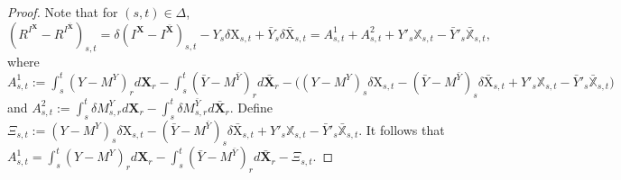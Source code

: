 \documentclass[11pt,reqno]{amsart}
\numberwithin{equation}{section}
\begin{document}
\begin{proof} 
Note that for $(s,t) \in \Delta$,
\begin{equation}\label{e:R-R = Xi + Y'X}
(R^{I^{\mathbf X}} - R^{I^{\bar{\mathbf X}}})_{s,t} = \delta(I^{\mathbf X} - I^{\bar{\mathbf X}})_{s,t} - Y_{s}\delta \mathrm X_{s,t} + \bar Y_{s}\delta \bar{\mathrm X}_{s,t} = A^1_{s,t} + A^{2}_{s,t} + Y'_{s} \mathbb X_{s,t} - \bar Y'_{s} \bar{\mathbb X}_{s,t}, 
\end{equation}
where
$
A^1_{s,t} := \int_{s}^{t} (Y - M^Y)_r d\mathbf X_r - \int_{s}^{t} (\bar Y - M^{\bar Y})_r d\bar{\mathbf X}_r - \big( (Y - M^Y)_{s}\delta \mathrm X_{s,t} - (\bar Y - M^{\bar Y})_{s}\delta \bar{\mathrm X}_{s,t} + Y'_{s} \mathbb X_{s,t} - \bar Y'_{s} \bar{\mathbb X}_{s,t} \big)
$ and $A^2_{s,t} := \int_{s}^{t} \delta M^{Y}_{s,r} d\mathbf X_r - \int_{s}^{t} \delta M^{\bar Y}_{s,r} d\bar{\mathbf X}_r$. 
Define
$
\Xi_{s,t} := (Y - M^Y)_{s}\delta\mathrm X_{s,t} - (\bar Y - M^{\bar Y})_{s}\delta \bar{\mathrm X}_{s,t} + Y'_{s} \mathbb X_{s,t} - \bar Y'_{s} \bar{\mathbb X}_{s,t}
$. 
It follows that
$A^1_{s,t} = \int_{s}^{t} (Y - M^Y)_{r} d\mathbf X_r - \int_{s}^{t} (\bar Y - M^{\bar Y})_{r} d\bar{\mathbf X}_r - \Xi_{s,t}$.


\end{proof}
\end{document}
